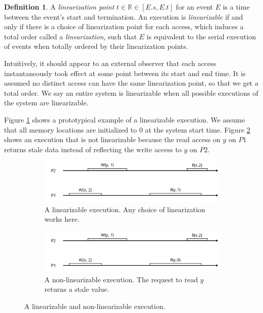 \documentclass[]             %
{NASA}                       %
\theoremstyle{definition}
\newtheorem{definition}{Definition}[section]
\begin{document}
\begin{definition}
A \emph{linearization point} $t \in \mathbb{R} \in [E.s, E.t]$ for an
event $E$ is a time between the event's start and termination. An
execution is \emph{linearizable} if and only if there is a choice of
linearization point for each access, which induces a total order called a \emph{linearization},
such that $E$ is equivalent to
the serial execution of events when totally ordered by their
linearization points.
\end{definition}

Intuitively, it should appear to an external observer that each access
instantaneously took effect at some point between its start and end
time. It is assumed no distinct access can have the same linearization
point, so that we get a total order. We say an entire system is
linearizable when all possible executions of the system are
linearizable.

Figure \ref{fig:linear_example11} shows a prototypical example of a
linearizable execution. We assume that all memory locations are
initialized to \(0\) at the system start time. Figure
\ref{fig:linear_example12} shows an execution that is not linearizable
because the read access on \(y\) on \(P1\) returns stale data instead of
reflecting the write access to \(y\) on \(P2\).

\begin{figure}
     \begin{subfigure}[a]{1\textwidth}
         \center
         \includegraphics[scale=0.4]{images/linear1.png}
         \caption{A linearizable execution. Any choice of linearization works here.}
         \label{fig:linear_example11}
     \end{subfigure}
     \begin{subfigure}[b]{1\textwidth}
         \center
         \includegraphics[scale=0.4]{images/nonlinear0.png}
         \caption{A non-linearizable execution. The request to read $y$ returns a stale value. }
         \label{fig:linear_example12}
     \end{subfigure}
  \caption{A linearizable and non-linearizable execution.}
  \label{fig:linear_example1}
\end{figure}
\end{document}
